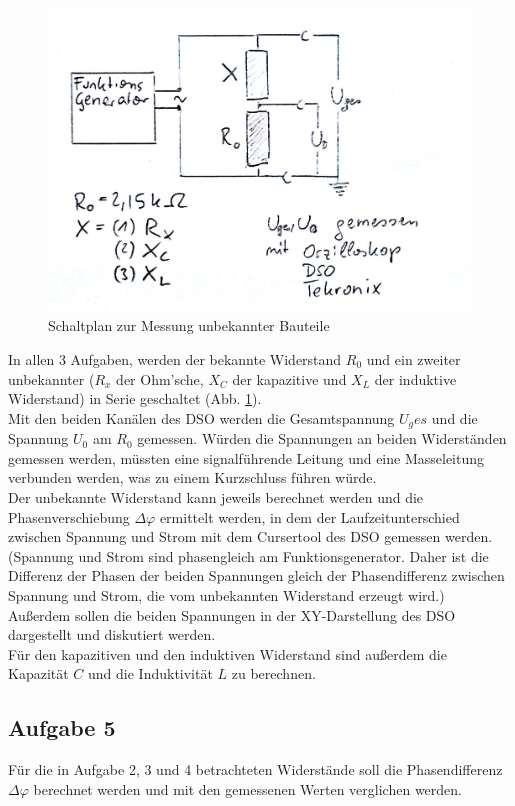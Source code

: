 \documentclass[12pt,a4paper]{article}
\begin{document}
\begin{multicols}{2}
\begin{figure}[H]
	\centering
	\includegraphics[scale=0.6]{./figure/Schaltplan_Aufgabe2.png}
	\caption{Schaltplan zur Messung unbekannter Bauteile}
	\label{fig:plan2bis4}
\end{figure}

In allen 3 Aufgaben, werden der bekannte Widerstand $R_0$ und ein zweiter unbekannter ($R_x$ der Ohm'sche, $X_C$ der kapazitive und $X_L$ der induktive Widerstand) in Serie geschaltet (Abb. \ref{fig:plan2bis4}).\\
Mit den beiden Kanälen des DSO werden die Gesamtspannung $U_ges$ und die Spannung $U_0$ am $R_0$ gemessen. Würden die Spannungen an beiden Widerständen gemessen werden, müssten eine signalführende Leitung und eine Masseleitung verbunden werden, was zu einem Kurzschluss führen würde.\\
Der unbekannte Widerstand kann jeweils berechnet werden und die Phasenverschiebung $\Delta \varphi$ ermittelt werden, in dem der Laufzeitunterschied zwischen Spannung und Strom mit dem Cursertool des DSO gemessen werden. (Spannung und Strom sind phasengleich am Funktionsgenerator. Daher ist die Differenz der Phasen der beiden Spannungen gleich der Phasendifferenz zwischen Spannung und Strom, die vom unbekannten Widerstand erzeugt wird.)\\
Außerdem sollen die beiden Spannungen in der XY-Darstellung des DSO dargestellt und diskutiert werden.\\
Für den kapazitiven und den induktiven Widerstand sind außerdem die Kapazität $C$ und die Induktivität $L$ zu berechnen.

\subsection{Aufgabe 5}
Für die in Aufgabe 2, 3 und 4 betrachteten Widerstände soll die Phasendifferenz $\Delta \varphi$ berechnet werden und mit den gemessenen Werten verglichen werden.

\end{multicols}
\end{document}
